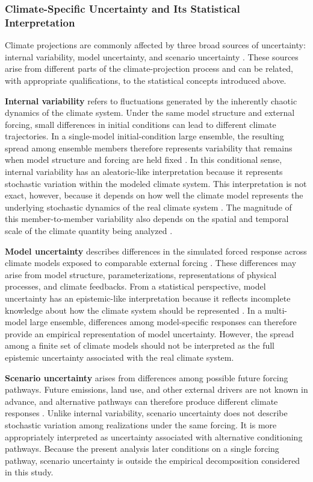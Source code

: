 \documentclass[
]{krantz}
\begin{document}
\subsubsection{Climate-Specific Uncertainty and Its Statistical Interpretation}\label{climate-specific-uncertainty-and-its-statistical-interpretation}

Climate projections are commonly affected by three broad sources of uncertainty: internal variability, model uncertainty, and scenario uncertainty \citep{Hawkins2009}. These sources arise from different parts of the climate-projection process and can be related, with appropriate qualifications, to the statistical concepts introduced above.

\textbf{Internal variability} refers to fluctuations generated by the inherently chaotic dynamics of the climate system. Under the same model structure and external forcing, small differences in initial conditions can lead to different climate trajectories. In a single-model initial-condition large ensemble, the resulting spread among ensemble members therefore represents variability that remains when model structure and forcing are held fixed \citep{Gruber2026}. In this conditional sense, internal variability has an aleatoric-like interpretation because it represents stochastic variation within the modeled climate system. This interpretation is not exact, however, because it depends on how well the climate model represents the underlying stochastic dynamics of the real climate system \citep{Gruber2026}. The magnitude of this member-to-member variability also depends on the spatial and temporal scale of the climate quantity being analyzed \citep{Hawkins2009}.

\textbf{Model uncertainty} describes differences in the simulated forced response across climate models exposed to comparable external forcing \citep{Hawkins2009}. These differences may arise from model structure, parameterizations, representations of physical processes, and climate feedbacks. From a statistical perspective, model uncertainty has an epistemic-like interpretation because it reflects incomplete knowledge about how the climate system should be represented \citep{Gruber2025}. In a multi-model large ensemble, differences among model-specific responses can therefore provide an empirical representation of model uncertainty. However, the spread among a finite set of climate models should not be interpreted as the full epistemic uncertainty associated with the real climate system.

\textbf{Scenario uncertainty} arises from differences among possible future forcing pathways. Future emissions, land use, and other external drivers are not known in advance, and alternative pathways can therefore produce different climate responses \citep{Hawkins2009}. Unlike internal variability, scenario uncertainty does not describe stochastic variation among realizations under the same forcing. It is more appropriately interpreted as uncertainty associated with alternative conditioning pathways. Because the present analysis later conditions on a single forcing pathway, scenario uncertainty is outside the empirical decomposition considered in this study.
\end{document}
